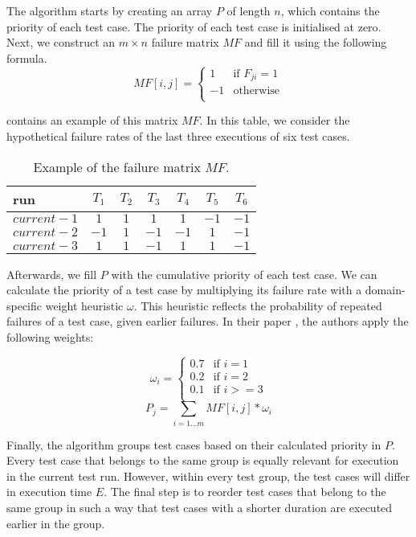 \noindent The algorithm starts by creating an array $P$ of length $n$, which contains the priority of each test case. The priority of each test case is initialised at zero. Next, we construct an $m \times n$ failure matrix $MF$ and fill it using the following formula.
\[
	MF[i, j] = \left\{
	\begin{array}{rl}
		1 & \text{if } F_{ji} = 1 \\
		-1 & \text{otherwise} \\
		\end{array}
	\right.
\]

\noindent {} contains an example of this matrix $MF$. In this table, we consider the hypothetical failure rates of the last three executions of six test cases.\\

\begin{table}[h]
\centering
\begin{tabular}{| l || c | c | c | c | c | c |}
	\hline
	\textbf{run} & \textbf{$T_1$} & \textbf{$T_2$} & \textbf{$T_3$} & \textbf{$T_4$} & \textbf{$T_5$} & \textbf{$T_6$}\\\hline
	$current - 1$ & $1$ & $1$ & $1$ & $1$ & $-1$ & $-1$\\
	$current - 2$ & $-1$ & $1$ & $-1$ & $-1$ & $1$ & $-1$\\
	$current - 3$ & $1$ & $1$ & $-1$ & $1$ & $1$ & $-1$\\
	\hline
\end{tabular}
\caption{Example of the failure matrix $MF$.}
\label{tbl:rocket-failurematrix}
\end{table}

\noindent Afterwards, we fill $P$ with the cumulative priority of each test case. We can calculate the priority of a test case by multiplying its failure rate with a domain-specific weight heuristic $\omega$. This heuristic reflects the probability of repeated failures of a test case, given earlier failures. In their paper \cite{6676952}, the authors apply the following weights:

\[
	\omega_i = \left.
	\begin{cases}
		0.7 & \text{if } i = 1 \\
		0.2 & \text{if } i = 2 \\
		0.1 & \text{if } i >= 3 \\
	\end{cases}
	\right.
\]
$$P_j = \sum_{i = 1 \dots m} MF[i, j] * \omega_i$$

\noindent Finally, the algorithm groups test cases based on their calculated priority in $P$. Every test case that belongs to the same group is equally relevant for execution in the current test run. However, within every test group, the test cases will differ in execution time $E$. The final step is to reorder test cases that belong to the same group in such a way that test cases with a shorter duration are executed earlier in the group.

